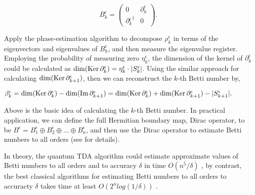 \documentclass[aps,pra,twocolumn,superscriptaddress]{revtex4-1}
\begin{document}
\[B_k^\epsilon  = \left( {\begin{array}{*{20}{c}}0&{\partial _k^\epsilon }\\{\partial {{_k^\epsilon }^\dag }}&0\end{array}} \right).\]

Apply the phase-estimation algorithm to decompose ${\rho _k^\epsilon }$ in terms of the eigenvectors and eigenvalues of ${B_k^\epsilon }$, and then measure the eigenvalue register. Employing the  probability of measuring zero ${\eta _k^\epsilon }$, the dimension of the kernel of ${\partial _k^\epsilon }$ could be calculated as ${\dim({\rm{Ker}}\,\partial _k^\epsilon) = \eta _k^\epsilon  \cdot |S_k^\epsilon |}$. Using the similar approach for calculating ${\dim({\rm{Ker}}\,\partial _{k + 1}^\epsilon )}$, then we can reconstruct the ${k}$-th Betti number by,

$
\beta _k^\epsilon =\dim({\rm{Ker}}\,\partial _k^\epsilon)  - \dim({\mathop{\rm Im}\nolimits} \,\partial _{k{\rm{ + }}1}^\epsilon) \nonumber=\dim({\rm{Ker}}\,\partial _k^\epsilon)  + \dim({\rm{Ker}}\,\partial _{k{\rm{ + }}1}^\epsilon) - |S_{k + 1}^\epsilon |.
$

Above is the basic idea of calculating the $k$-th Betti number. In practical application, we can define the full Hermitian boundary map, Dirac operator, to be ${B^\epsilon } = B_1^\epsilon  \oplus B_2^\epsilon  \oplus ... \oplus B_n^\epsilon$, and then use the Dirac operator to estimate Betti numbers to all orders (see \cite{lloyd2016quantum} for details).

In theory, the quantum TDA algorithm could estimate approximate values of Betti numbers to all orders and to accuracy $\delta$ in time $O({n^5}/\delta )$ \cite{lloyd2016quantum}, by contrast, the best classical algorithms for estimating Betti numbers to all orders to accuracty $\delta$ takes time at least $O({2^n}log(1/\delta ))$ \cite{cohen2007stability,basu1999bounding,*basu2003different,*basu2008computing,*basu2014algorithms,friedman1998computing}.


\end{document}
